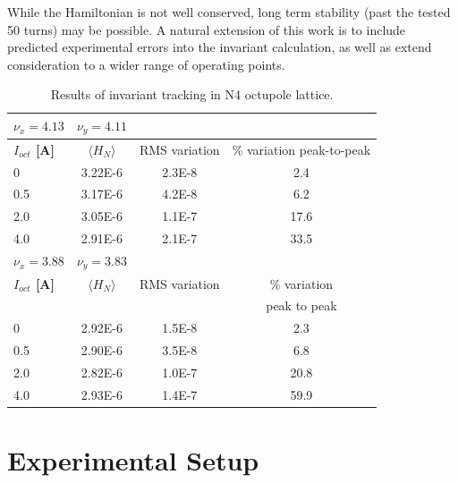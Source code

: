 While the Hamiltonian is not well conserved, long term stability (past the tested 50 turns) may be possible. A natural extension of this work is to include predicted experimental errors into the invariant calculation, as well as extend consideration to a wider range of operating points.






\begin{table}[]
   \centering
   \caption{Results of invariant tracking in N4 octupole lattice.}
   \begin{tabular}{lccc} \hline
	   $\nu_x=4.13$ & $\nu_y=4.11$\\ \hline
       \textbf{$I_{oct}$ [A]} & \textbf{$\langle H_N \rangle$}        &RMS variation             & \% variation peak-to-peak  \\
           0        & 3.22E-6    &2.3E-8      & 2.4       \\ %
          0.5       & 3.17E-6     &4.2E-8     & 6.2       \\ %
           2.0        & 3.05E-6    &1.1E-7     &17.6       \\ %
           4.0      & 2.91E-6      &2.1E-7   & 33.5        \\ \hline
	   $\nu_x=3.88$ & $\nu_y=3.83$\\ \hline
       \textbf{$I_{oct}$ [A]} & \textbf{$\langle H_N \rangle$}          &RMS variation          & \% variation \\
		& & & peak to peak\\
           0        & 2.92E-6      &1.5E-8    & 2.3       \\ %
          0.5       & 2.90E-6      &3.5E-8    & 6.8       \\ %
           2.0        & 2.82E-6     & 1.0E-7    & 20.8       \\ %
           4.0      & 2.93E-6       & 1.4E-7   & 59.9        \\

   \end{tabular}
   \label{l2ea4-t1}
\end{table}


\section{Experimental Setup}


